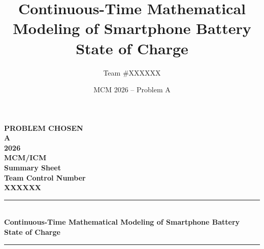 \documentclass[12pt]{article}
\title{\textbf{Continuous-Time Mathematical Modeling of Smartphone Battery State of Charge}}
\author{Team \#XXXXXX}
\date{MCM 2026 -- Problem A}
\begin{document}
\begin{titlepage}
\centering
\vspace*{2cm}

{\Large \textbf{PROBLEM CHOSEN}}\\[0.5cm]
{\LARGE \textbf{A}}\\[2cm]

{\Large \textbf{2026}}\\
{\Large \textbf{MCM/ICM}}\\
{\Large \textbf{Summary Sheet}}\\[2cm]

{\Large \textbf{Team Control Number}}\\[0.3cm]
{\LARGE \textbf{XXXXXX}}\\[2cm]

\rule{\textwidth}{1pt}\\[0.5cm]
{\Large \textbf{Continuous-Time Mathematical Modeling of Smartphone Battery State of Charge}}\\[0.5cm]
\rule{\textwidth}{1pt}

\vfill

\end{titlepage}



\newpage
\tableofcontents
\newpage










\newpage



\newpage
\appendix

\end{document}
